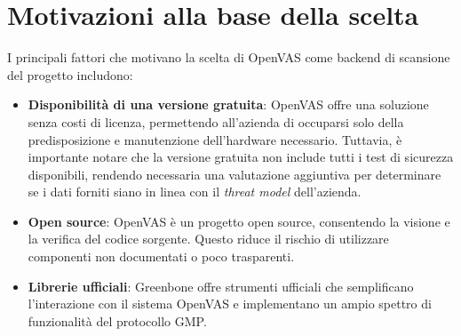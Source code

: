 \section{Motivazioni alla base della scelta}
I principali fattori che motivano la scelta di OpenVAS come backend di scansione del progetto includono:

\begin{itemize}
    \item \textbf{Disponibilità di una versione gratuita}: OpenVAS offre una soluzione senza costi di licenza, permettendo all'azienda di occuparsi solo della predisposizione e manutenzione dell'hardware necessario. Tuttavia, è importante notare che la versione gratuita non include tutti i test di sicurezza disponibili, rendendo necessaria una valutazione aggiuntiva per determinare se i dati forniti siano in linea con il \emph{threat model} dell'azienda.
    
    \item \textbf{Open source}: OpenVAS è un progetto open source, consentendo la visione e la verifica del codice sorgente. Questo riduce il rischio di utilizzare componenti non documentati o poco trasparenti.

    \item \textbf{Librerie ufficiali}: Greenbone offre strumenti ufficiali che semplificano l'interazione con il sistema OpenVAS e implementano un ampio spettro di funzionalità del protocollo GMP.
\end{itemize}
